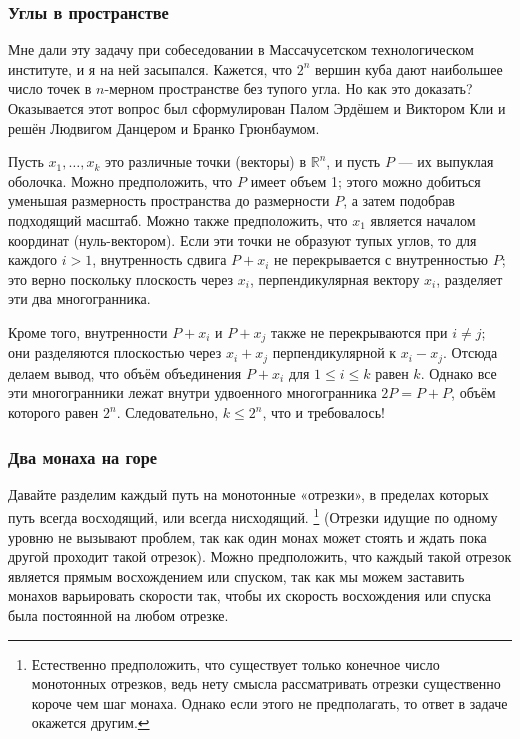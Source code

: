 \subsubsection*{Углы в пространстве}

Мне дали эту задачу при собеседовании в Массачусетском технологическом институте, и я на ней засыпался.
Кажется, что $2^n$ вершин куба дают наибольшее число точек в $n$-мерном пространстве без тупого угла.
Но как это доказать?
Оказывается этот вопрос был сформулирован Палом Эрдёшем и Виктором Кли и решён Людвигом Данцером и Бранко Грюнбаумом. %

\medskip

Пусть $x_1,\dots,x_k$ это различные точки (векторы) в $\mathbb{R}^n$, и пусть $P$ --- их выпуклая оболочка.
Можно предположить, что $P$ имеет объем 1;
этого можно добиться уменьшая размерность пространства до размерности $P$, а затем подобрав подходящий масштаб.
Можно также предположить, что $x_1$ является началом координат (нуль-вектором).
Если эти точки не образуют тупых углов, то для каждого $i>1$, внутренность сдвига $P+x_i$ не перекрывается с внутренностью $P$;
это верно поскольку плоскость через $x_i$, перпендикулярная вектору $x_i$, разделяет эти два многогранника.

Кроме того, внутренности $P+x_i$ и $P+x_j$ также не перекрываются при $i\ne j$;
они разделяются плоскостью через $x_i+x_j$ перпендикулярной к $x_i-x_j$.
Отсюда делаем вывод, что объём объединения $P+x_i$ для $1 \le i \le k$ равен $k$.
Однако все эти многогранники лежат внутри удвоенного многогранника $2P = P+P$, объём которого равен $2^n$. Следовательно, $k \le 2^n$, что и требовалось!
\heart

\subsubsection*{Два монаха на горе}

Давайте разделим каждый путь на монотонные «отрезки», в пределах которых путь всегда восходящий, или всегда нисходящий.
\footnote{Естественно предположить, что существует только конечное число монотонных отрезков, ведь нету смысла рассматривать отрезки существенно короче чем шаг монаха.
Однако если этого не предполагать, то ответ в задаче окажется другим.
}
(Отрезки идущие по одному уровню не вызывают проблем, так как один монах может стоять и ждать пока другой проходит такой отрезок).
Можно предположить, что каждый такой отрезок является прямым восхождением или спуском, так как мы можем заставить монахов варьировать скорости так, чтобы их скорость восхождения или спуска была постоянной на любом отрезке.

